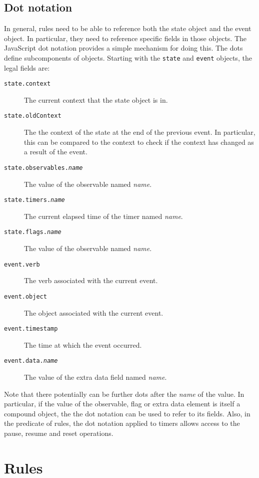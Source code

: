 \documentclass{article}
\begin{document}
  \subsection{Dot notation}
  \label{sub:dot}

  In general, rules need to be able to reference both the state object
  and the event object.  In particular, they need to reference
  specific fields in those objects.  The JavaScript dot notation
  provides a simple mechanism for doing this.  The dots define
  subcomponents of objects.  Starting with the \texttt{state} and
  \texttt{event} objects, the legal fields are:
  \begin{description}
    \item[\texttt{state.context}]{The current context that the state
      object is in.}
    \item[\texttt{state.oldContext}]{The the context of the state at
      the end of the previous event.  In particular, this can be
      compared to the context to check if the context has changed as a
      result of the event.} 
    \item[\texttt{state.observables.\textit{name}}]{The value of the
      observable named \textit{name}.}
    \item[\texttt{state.timers.\textit{name}}]{The current elapsed
      time of the timer named \textit{name}.}
    \item[\texttt{state.flags.\textit{name}}]{The value of the
      observable named \textit{name}.}
    \item[\texttt{event.verb}]{The verb associated with the current event.}
    \item[\texttt{event.object}]{The object associated with the current event.}
    \item[\texttt{event.timestamp}]{The time at which the event
      occurred.}
    \item[\texttt{event.data.\textit{name}}]{The value of the
      extra data field named \textit{name}.}
  \end{description}

  Note that there potentially can be further dots after the
  \textit{name} of the value.  In particular, if the value of the
  observable, flag or extra data element is itself a compound object,
  the the dot notation can be used to refer to its fields.  Also, in
  the predicate of rules, the dot notation applied to timers allows
  access to the pause, resume and reset operations.

  \section{Rules}
  \label{sec:Rules}
\end{document}
